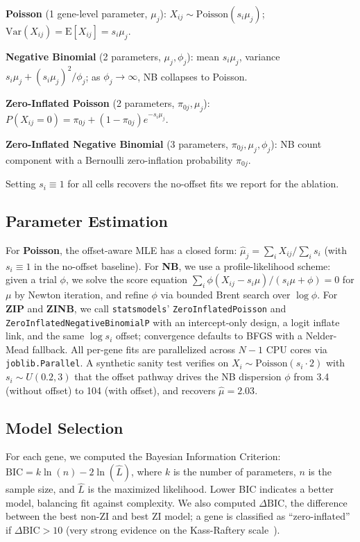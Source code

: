 \documentclass{article}
\begin{document}
\textbf{Poisson} (1 gene-level parameter, $\mu_j$):
$X_{ij}\sim \mathrm{Poisson}(s_i\mu_j)$; $\text{Var}(X_{ij}) = \mathrm{E}[X_{ij}] = s_i\mu_j$.

\textbf{Negative Binomial} (2 parameters, $\mu_j, \phi_j$):
mean $s_i\mu_j$, variance $s_i\mu_j + (s_i\mu_j)^2/\phi_j$; as $\phi_j\to\infty$, NB collapses to Poisson.

\textbf{Zero-Inflated Poisson} (2 parameters, $\pi_{0j}, \mu_j$):
$P(X_{ij}=0) = \pi_{0j} + (1-\pi_{0j})e^{-s_i\mu_j}$.

\textbf{Zero-Inflated Negative Binomial} (3 parameters, $\pi_{0j}, \mu_j, \phi_j$):
NB count component with a Bernoulli zero-inflation probability $\pi_{0j}$.

Setting $s_i\equiv 1$ for all cells recovers the no-offset fits we report for the ablation.

\subsection{Parameter Estimation}

For \textbf{Poisson}, the offset-aware MLE has a closed form: $\hat\mu_j = \sum_i X_{ij}/\sum_i s_i$ (with $s_i\equiv 1$ in the no-offset baseline).
For \textbf{NB}, we use a profile-likelihood scheme: given a trial $\phi$, we solve the score equation $\sum_i \phi(X_{ij}-s_i\mu)/(s_i\mu+\phi)=0$ for $\mu$ by Newton iteration, and refine $\phi$ via bounded Brent search over $\log\phi$.
For \textbf{ZIP} and \textbf{ZINB}, we call \texttt{statsmodels}' \texttt{ZeroInflatedPoisson} and \texttt{ZeroInflatedNegativeBinomialP} with an intercept-only design, a logit inflate link, and the same $\log s_i$ offset; convergence defaults to BFGS with a Nelder-Mead fallback.
All per-gene fits are parallelized across $N-1$ CPU cores via \texttt{joblib.Parallel}.
A synthetic sanity test verifies on \mbox{$X_i\sim\text{Poisson}(s_i\cdot 2)$} with $s_i\sim U(0.2,3)$ that the offset pathway drives the NB dispersion $\phi$ from 3.4 (without offset) to 104 (with offset), and recovers $\hat\mu=2.03$.

\subsection{Model Selection}

For each gene, we computed the Bayesian Information Criterion:
$\text{BIC} = k \ln(n) - 2 \ln(\hat{L})$,
where $k$ is the number of parameters, $n$ is the sample size, and $\hat{L}$ is the maximized likelihood.
Lower BIC indicates a better model, balancing fit against complexity.
We also computed $\Delta\text{BIC}$, the difference between the best non-ZI and best ZI model; a gene is classified as ``zero-inflated'' if $\Delta\text{BIC} > 10$ (very strong evidence on the Kass-Raftery scale~\cite{kass1995bayes}).
\end{document}
